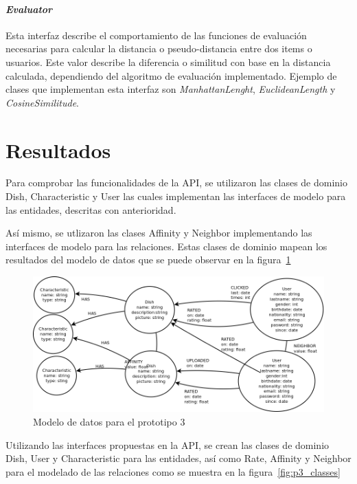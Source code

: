     \paragraph{\emph{Evaluator}}
      Esta interfaz describe el comportamiento de las funciones de evaluación necesarias para calcular la distancia o pseudo-distancia entre dos items o usuarios. Este valor describe la diferencia o similitud con base en la distancia calculada, dependiendo del algoritmo de evaluación implementado. Ejemplo de clases que implementan esta interfaz son \emph{ManhattanLenght}, \emph{EuclideanLength} y \emph{CosineSimilitude}. 

    
  \section{Resultados}
    Para comprobar las funcionalidades de la API, se utilizaron las clases de dominio Dish, Characteristic y User las cuales implementan las interfaces de modelo para las entidades, descritas con anterioridad.

    Así mismo, se utlizaron las clases Affinity y Neighbor implementando las interfaces de modelo para las relaciones. Estas clases de dominio mapean los resultados del modelo de datos que se puede observar en la figura~\ref{fig:p3_db}

    \begin{figure}[h!]
      \centering
      \includegraphics[width=16cm]{./images/p3_bd}
      \caption{Modelo de datos para el prototipo 3}
      \label{fig:p3_db}
    \end{figure}

    Utilizando las interfaces propuestas en la API, se crean las clases de dominio Dish, User y Characteristic para las entidades, así como Rate, Affinity y Neighbor para el modelado de las relaciones como se muestra en la figura~\ref{fig:p3_classes}

